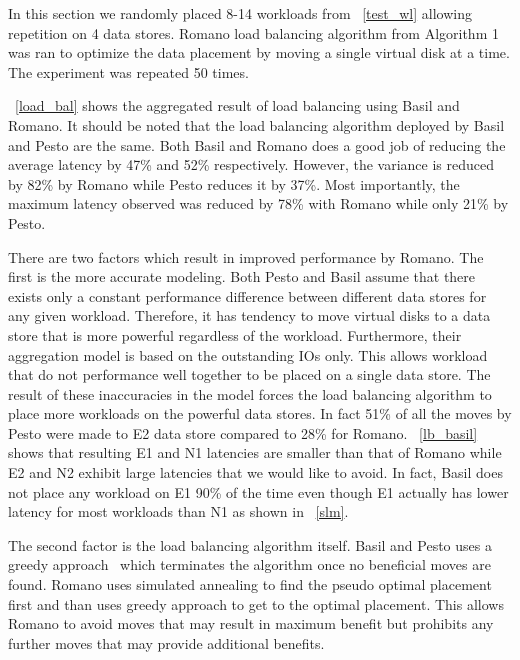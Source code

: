 In this section we randomly placed 8-14 workloads from \tablename~\ref{test_wl} allowing repetition on 4 data stores.
Romano load balancing algorithm from Algorithm 1 was ran to optimize the data placement by moving a single virtual disk at a time.
The experiment was repeated 50 times.

\figurename~\ref{load_bal} shows the aggregated result of load balancing using Basil and Romano.
It should be noted that the load balancing algorithm deployed by Basil and Pesto are the same.
Both Basil and Romano does a good job of reducing the average latency by 47\% and 52\% respectively.
However, the variance is reduced by 82\% by Romano while Pesto reduces it by 37\%.
Most importantly, the maximum latency observed was reduced by 78\% with Romano while only 21\% by Pesto.

There are two factors which result in improved performance by Romano.
The first is the more accurate modeling.
Both Pesto and Basil assume that there exists only a constant performance difference between different data stores for any given workload.
Therefore, it has tendency to move virtual disks to a data store that is more powerful regardless of the workload.
Furthermore, their aggregation model is based on the outstanding IOs only.
This allows workload that do not performance well together to be placed on a single data store.
The result of these inaccuracies in the model forces the load balancing algorithm to place more workloads on the powerful data stores.
In fact 51\% of all the moves by Pesto were made to E2 data store compared to 28\% for Romano.
\figurename~\ref{lb_basil} shows that resulting E1 and N1 latencies are smaller than that of Romano while E2 and N2 exhibit large latencies that we would like to avoid.
In fact, Basil does not place any workload on E1 90\% of the time even though E1 actually has lower latency for most workloads than N1 as shown in \figurename~\ref{slm}.

The second factor is the load balancing algorithm itself.
Basil and Pesto uses a greedy approach~\cite{gulati:2010} which terminates the algorithm once no beneficial moves are found.
Romano uses simulated annealing to find the pseudo optimal placement first and than uses greedy approach to get to the optimal placement.
This allows Romano to avoid moves that may result in maximum benefit but prohibits any further moves that may provide additional benefits.

